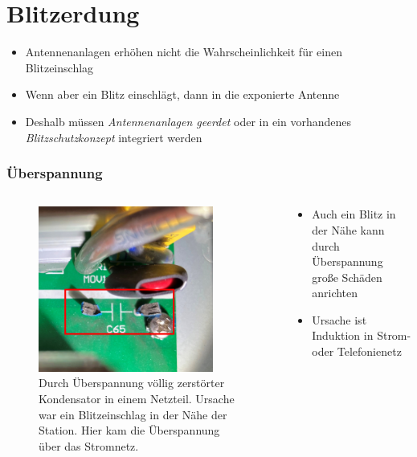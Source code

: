 
\section{Blitzerdung}
\label{section:blitzerdung}
\begin{frame}%
\begin{itemize}
  \item Antennenanlagen erhöhen nicht die Wahrscheinlichkeit für einen Blitzeinschlag
  \item Wenn aber ein Blitz einschlägt, dann in die exponierte Antenne
  \item Deshalb müssen \emph{Antennenanlagen geerdet} oder in ein vorhandenes \emph{Blitzschutzkonzept} integriert werden
  \end{itemize}

\end{frame}

\begin{frame}
\frametitle{Überspannung}
\begin{columns}
    \begin{column}{0.48\textwidth}
    
\begin{figure}
    \includegraphics[width=0.85\textwidth]{foto/191}
    \caption{\scriptsize Durch Überspannung völlig zerstörter Kondensator in einem Netzteil. Ursache war ein Blitzeinschlag in der Nähe der Station. Hier kam die Überspannung über das Stromnetz.}
    \label{}
\end{figure}

    \end{column}
   \begin{column}{0.48\textwidth}
       \begin{itemize}
  \item Auch ein Blitz in der Nähe kann durch Überspannung große Schäden anrichten
  \item Ursache ist Induktion in Strom- oder Telefonienetz
  \end{itemize}

   \end{column}
\end{columns}

\end{frame}

